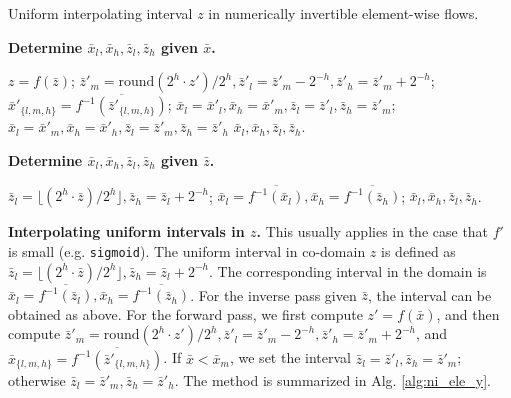 \documentclass{article}
\newcommand{\quant}[1]{\bar{#1}}
\begin{document}
\begin{algorithm}[ht]
\small
\caption{Uniform interpolating interval $z$ in numerically invertible element-wise flows.}
\begin{multicols}{2} 
\textbf{Determine $\quant{x}_l, \quant{x}_h, \quant{z}_l, \quant{z}_h$ given $\quant{x}$.} 

\begin{algorithmic}[1]
\STATE $z = f (\quant{z})$; 
\STATE $\quant{z}'_m = \mathrm{round}(2^h \cdot z') / 2^h, \quant{z}'_l = \quant{z}'_m - 2^{-h}, \quant{z}'_h = \quant{z}'_m + 2^{-h}$;
\STATE $\quant{x}'_{\{l,m,h\}} = \overline{f^{-1} (\quant{z}'_{\{l,m,h\}})}$;
\IF {$\quant{x} < \quant{x}'_m$}
\STATE $\quant{x}_l =  \quant{x}'_l, \quant{x}_h = \quant{x}'_m, \quant{z}_l =  \quant{z}'_l, \quant{z}_h = \quant{z}'_m$;
\ELSE
\STATE $\quant{x}_l = \quant{x}'_m, \quant{x}_h = \quant{x}'_h, \quant{z}_l = \quant{z}'_m, \quant{z}_h = \quant{z}'_h$
\ENDIF
\RETURN $\quant{x}_l, \quant{x}_h, \quant{z}_l, \quant{z}_h$.
\end{algorithmic}

\vspace{8pt}
\textbf{Determine $\quant{x}_l, \quant{x}_h, \quant{z}_l, \quant{z}_h$ given $\quant{z}$.} 

\begin{algorithmic}[1]
\STATE $\quant{z}_l = \lfloor (2^h \cdot \quant{z}) / 2^h \rfloor, \quant{z}_h = \quant{z}_l + 2^{-h}$;
\STATE $\quant{x}_l = \overline{f^{-1}(\quant{x}_l)}, \quant{x}_h = \overline{f^{-1}(\quant{z}_h)}$;
\RETURN $\quant{x}_l, \quant{x}_h, \quant{z}_l, \quant{z}_h$.
\end{algorithmic}

\end{multicols}
\vspace{-8pt}
\label{alg:ni_ele_y}
\end{algorithm}



\textbf{Interpolating uniform intervals in $z$.}
This usually applies in the case that $f'$ is small (e.g. \texttt{sigmoid}). The uniform interval in co-domain $z$ is defined as $\quant{z}_l = \lfloor (2^h \cdot \quant{z}) / 2^h \rfloor, \quant{z}_h = \quant{z}_l + 2^{-h}$. The corresponding interval in the domain is $\quant{x}_l = \overline{f^{-1}(\quant{z}_l)}, \quant{x}_h = \overline{f^{-1}(\quant{z}_h)}$. For the inverse pass given $\quant{z}$, the interval can be obtained as above. For the forward pass, we first compute $z' = f(\quant{x})$, and then compute $\quant{z}'_m = \mathrm{round}(2^h \cdot z') / 2^h, \quant{z}'_l = \quant{z}'_m - 2^{-h}, \quant{z}'_h = \quant{z}'_m + 2^{-h}$, and $\quant{x}_{\{l,m,h\}} = \overline{f^{-1}(\quant{z}'_{\{l,m,h\}})}$. If $\quant{x} < \quant{x}_m$, we set the interval $\quant{z}_l =  \quant{z}'_l, \quant{z}_h = \quant{z}'_m$; otherwise $\quant{z}_l = \quant{z}'_m, \quant{z}_h = \quant{z}'_h$. The method is summarized in Alg. \ref{alg:ni_ele_y}.
\end{document}
